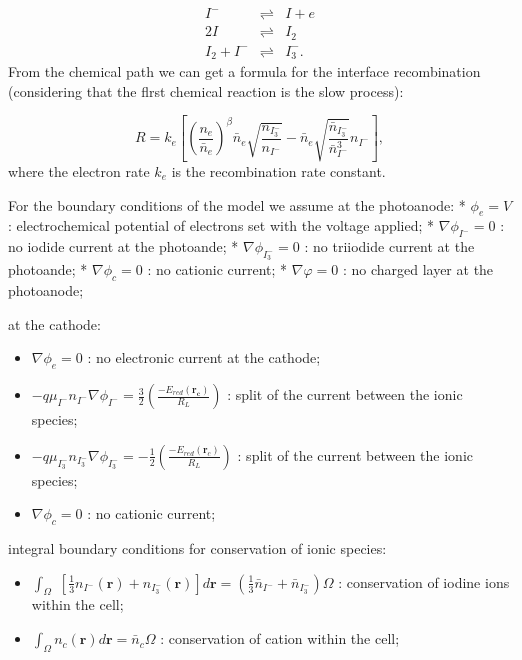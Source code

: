 \documentclass[letterpaper,10pt,english]{sphinxmanual}
\begin{document}
\begin{eqnarray}
I^{-} & \rightleftharpoons & I + e \\
2I & \rightleftharpoons & I_{2} \\
I_{2} + I^{-} & \rightleftharpoons & I^{-}_{3}.
\label{reaction_loss}
\end{eqnarray}
From the chemical path we can get a formula for the interface recombination (considering
that the flrst chemical reaction is the slow process):

\begin{equation}\label{ricombinazione}
R = k_{e} \left [  \left ( \frac{n_{e}}{\bar{n}_{e}} \right )^{\beta}\bar{n}_{e}\sqrt{\frac{n_{I^{-}_{3}}}{n_{I^{-}}}}
- \bar{n}_{e}\sqrt{\frac{\bar{n}_{I^{-}_{3}}}{\bar{n}^{3}_{I^{-}}}} n_{I^{-}}\right
],
\end{equation}
where the electron rate $k_e$ is the recombination rate constant.


For the boundary conditions of the model we assume at the photoanode:
*  $\phi_{e} = V$ : electrochemical potential of electrons set with the voltage applied;
*  $\nabla\phi_{I^{-}}  = 0$ : no iodide current at the photoande;
*  $\nabla\phi_{I_{3}^{-}} = 0$ : no triiodide current at the photoande;
*  $\nabla\phi_{c} = 0$ : no cationic current;
*  $\nabla\varphi = 0$ : no charged layer at the photoanode;


at the cathode:

\begin{itemize}
\item {} 
$\nabla\phi_{e} = 0$ : no electronic current at the cathode;


\item {} 
$-q\mu_{I^{-}}n_{I^{-}} \nabla\phi_{I^{-}} = \frac{3}{2}\left ( \frac{ - E_{red}(\mathbf{r_{c}})}{R_{L}} \right )$ : split of the current between the ionic species;


\item {} 
$-q\mu_{I^{-}_{3}} n_{I^{-}_{3}}\nabla\phi_{I^{-}_{3}} =  -\frac{1}{2}\left ( \frac{ - E_{red}(\mathbf{r}_{c})}{R_{L}} \right )$ : split of the current between the ionic species;


\item {} 
$\nabla\phi_{c} = 0$ : no cationic current;


\end{itemize}

integral boundary conditions for conservation of ionic species:

\begin{itemize}
\item {} 
$\int_{\Omega}$ $\left [ \frac{1}{3}n_{I^{-}}(\mathbf{r}) + n_{I^{-}_{3}}(\mathbf{r}) \right ] d\mathbf{r} = \left (\frac{1}{3}\bar{n}_{I^{-}} + \bar{n}_{I^{-}_{3}} \right )\Omega$ : conservation of iodine ions within the cell;


\item {} 
$\int_{\Omega} n_{c}(\mathbf{r}) d\mathbf{r}  =  \bar{n}_{c}\Omega$ : conservation of cation within the cell;


\end{itemize}
\end{document}
